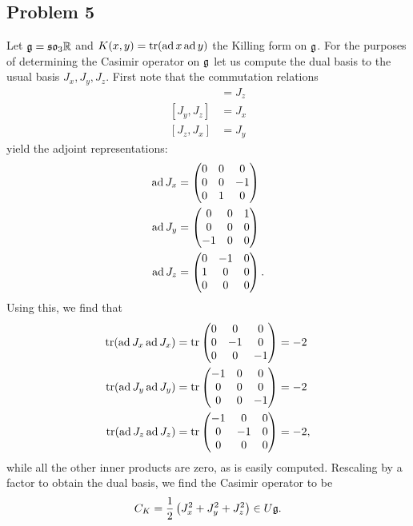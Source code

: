 \documentclass{../../mathnotes}
\begin{document}
\subsection*{Problem 5}

Let $\mathfrak g=\mathfrak{so}_3\mathbb{R}$ and $K(x,y)=\operatorname{tr}(\operatorname{ad} x\operatorname{ad} y)$ the Killing form on $\mathfrak g$. For the purposes of determining the Casimir operator on $\mathfrak g$ let
us compute the dual basis to the usual basis $J_x,J_y,J_z$. First note that the commutation relations
\begin{align*}
    [J_x,J_y]&=J_z\\
    [J_y,J_z]&=J_x\\
    [J_z,J_x]&=J_y
\end{align*}
yield the adjoint representations:
\begin{align*}
    \operatorname{ad} J_x&=\begin{pmatrix}0&0&0\\0&0&-1\\0&1&0\end{pmatrix}\\
    \operatorname{ad} J_y&=\begin{pmatrix}0&0&1\\0&0&0\\-1&0&0\end{pmatrix}\\
    \operatorname{ad} J_z&=\begin{pmatrix}0&-1&0\\1&0&0\\0&0&0\end{pmatrix}.
\end{align*}
Using this, we find that
\begin{align*}
    \operatorname{tr}(\operatorname{ad} J_x\operatorname{ad} J_x)&=\operatorname{tr}\begin{pmatrix}0&0&0\\0&-1&0\\0&0&-1\end{pmatrix}=-2\\
    \operatorname{tr}(\operatorname{ad} J_y\operatorname{ad} J_y)&=\operatorname{tr}\begin{pmatrix}-1&0&0\\0&0&0\\0&0&-1\end{pmatrix}=-2\\
    \operatorname{tr}(\operatorname{ad} J_z\operatorname{ad} J_z)&=\operatorname{tr}\begin{pmatrix}-1&0&0\\0&-1&0\\0&0&0\end{pmatrix}=-2,
\end{align*}
while all the other inner products are zero, as is easily computed. Rescaling by a factor to obtain the dual basis, we find the Casimir operator to be
\[C_K=\frac{1}{2}\left(J_x^2+J_y^2+J_z^2\right)\in U\mathfrak{g}.\]
\end{document}
